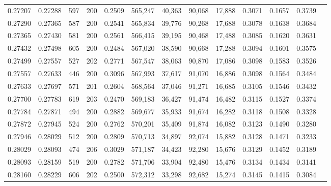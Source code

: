 \begin{tabular}{rrrrrrrrrrrrr}
0.27207 & 0.27288 &   597 & 200 &                                     0.2509 & 565,247 &  40,363 &  90,068 &  17,888 & 0.3071 & 0.1657 & 0.3739 \\
0.27290 & 0.27365 &   587 & 200 &                                     0.2541 & 565,834 &  39,776 &  90,268 &  17,688 & 0.3078 & 0.1638 & 0.3684 \\
0.27365 & 0.27430 &   581 & 200 &                                     0.2561 & 566,415 &  39,195 &  90,468 &  17,488 & 0.3085 & 0.1620 & 0.3631 \\
0.27432 & 0.27498 &   605 & 200 &                                     0.2484 & 567,020 &  38,590 &  90,668 &  17,288 & 0.3094 & 0.1601 & 0.3575 \\
0.27499 & 0.27557 &   527 & 202 &                                     0.2771 & 567,547 &  38,063 &  90,870 &  17,086 & 0.3098 & 0.1583 & 0.3526 \\
0.27557 & 0.27633 &   446 & 200 &                                     0.3096 & 567,993 &  37,617 &  91,070 &  16,886 & 0.3098 & 0.1564 & 0.3484 \\
0.27633 & 0.27697 &   571 & 201 &                                     0.2604 & 568,564 &  37,046 &  91,271 &  16,685 & 0.3105 & 0.1546 & 0.3432 \\
0.27700 & 0.27783 &   619 & 203 &                                     0.2470 & 569,183 &  36,427 &  91,474 &  16,482 & 0.3115 & 0.1527 & 0.3374 \\
0.27784 & 0.27871 &   494 & 200 &                                     0.2882 & 569,677 &  35,933 &  91,674 &  16,282 & 0.3118 & 0.1508 & 0.3328 \\
0.27872 & 0.27945 &   524 & 200 &                                     0.2762 & 570,201 &  35,409 &  91,874 &  16,082 & 0.3123 & 0.1490 & 0.3280 \\
0.27946 & 0.28029 &   512 & 200 &                                     0.2809 & 570,713 &  34,897 &  92,074 &  15,882 & 0.3128 & 0.1471 & 0.3233 \\
0.28029 & 0.28093 &   474 & 206 &                                     0.3029 & 571,187 &  34,423 &  92,280 &  15,676 & 0.3129 & 0.1452 & 0.3189 \\
0.28093 & 0.28159 &   519 & 200 &                                     0.2782 & 571,706 &  33,904 &  92,480 &  15,476 & 0.3134 & 0.1434 & 0.3141 \\
0.28160 & 0.28229 &   606 & 202 &                                     0.2500 & 572,312 &  33,298 &  92,682 &  15,274 & 0.3145 & 0.1415 & 0.3084 \\

\end{tabular}
